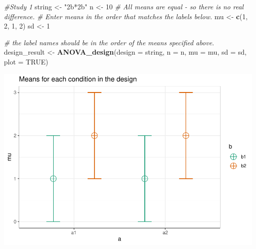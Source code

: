 \documentclass[]{book}
\newenvironment{Shaded}{\begin{snugshade}}{\end{snugshade}}
\newcommand{\CommentTok}[1]{\textcolor[rgb]{0.56,0.35,0.01}{\textit{#1}}}
\newcommand{\DataTypeTok}[1]{\textcolor[rgb]{0.13,0.29,0.53}{#1}}
\newcommand{\DecValTok}[1]{\textcolor[rgb]{0.00,0.00,0.81}{#1}}
\newcommand{\FloatTok}[1]{\textcolor[rgb]{0.00,0.00,0.81}{#1}}
\newcommand{\KeywordTok}[1]{\textcolor[rgb]{0.13,0.29,0.53}{\textbf{#1}}}
\newcommand{\NormalTok}[1]{#1}
\newcommand{\OperatorTok}[1]{\textcolor[rgb]{0.81,0.36,0.00}{\textbf{#1}}}
\newcommand{\OtherTok}[1]{\textcolor[rgb]{0.56,0.35,0.01}{#1}}
\newcommand{\StringTok}[1]{\textcolor[rgb]{0.31,0.60,0.02}{#1}}
\begin{document}
\begin{Shaded}
\begin{Highlighting}[]
\CommentTok{#Study 1}
\NormalTok{string <-}\StringTok{ "2b*2b"}
\NormalTok{n <-}\StringTok{ }\DecValTok{10}
\CommentTok{# All means are equal - so there is no real difference.}
\CommentTok{# Enter means in the order that matches the labels below.}
\NormalTok{mu <-}\StringTok{ }\KeywordTok{c}\NormalTok{(}\DecValTok{1}\NormalTok{, }\DecValTok{2}\NormalTok{, }\DecValTok{1}\NormalTok{, }\DecValTok{2}\NormalTok{) }
\NormalTok{sd <-}\StringTok{ }\DecValTok{1}

\CommentTok{# the label names should be in the order of the means specified above.}
\NormalTok{design_result <-}\StringTok{ }\KeywordTok{ANOVA_design}\NormalTok{(}\DataTypeTok{design =}\NormalTok{ string,}
                   \DataTypeTok{n =}\NormalTok{ n, }
                   \DataTypeTok{mu =}\NormalTok{ mu, }
                   \DataTypeTok{sd =}\NormalTok{ sd, }
                   \DataTypeTok{plot =} \OtherTok{TRUE}\NormalTok{)}
\end{Highlighting}
\end{Shaded}

\includegraphics{SuperpowerValidation_files/figure-latex/unnamed-chunk-161-1.pdf}

\begin{Shaded}
\end{Shaded}
\end{document}
